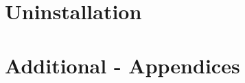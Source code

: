 \documentclass[11pt, a4paper, final]{report}
\begin{document}
\part{Uninstallation}
\label{part:uninstall}

\part{Additional - Appendices}
\appendix







\end{document}
